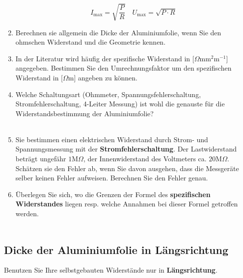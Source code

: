 \begin{enumerate}[$a)$]
{{\begin{center}
\end{center}}}
\begin{equation}
\boxed{I_{\text{max}}=\sqrt{\dfrac{P}{R}}}\quad \boxed{U_{\text{max}}=\sqrt{P\cdot R}}
\end{equation}
\item Berechnen sie allgemein die Dicke der Aluminiumfolie, wenn Sie den ohmschen Widerstand und die Geometrie kennen.
{}
\item In der Literatur wird häufig der spezifische Widerstand in [$\Omega\text{mm}^2\text{m}^{-1}$] angegeben. Bestimmen Sie den Umrechnungsfaktor um den spezifischen Widerstand in [$\Omega\text{m}$] angeben zu können.
{}
\item Welche Schaltungsart (Ohmmeter, Spannungsfehlerschaltung, Stromfehlerschaltung, 4-Leiter Messung) ist wohl die genauste für die Widerstandsbestimmung der Aluminiumfolie?
\\\\
{\color{red}{$\Rightarrow$ Die 4-Leiter-Messung.}}
\item Sie bestimmen einen elektrischen Widerstand durch Strom- und Spannungsmessung mit der \textbf{Stromfehlerschaltung}. Der Lastwiderstand beträgt ungefähr $1\text{M}\Omega$, der Innenwiderstand des Voltmeters ca. $20\text{M}\Omega$. Schätzen sie den Fehler ab, wenn Sie davon ausgehen, dass die Messgeräte selber keinen Fehler aufweisen. Berechnen Sie den Fehler genau.
{}
\item Überlegen Sie sich, wo die Grenzen der Formel des \textbf{spezifischen Widerstandes} liegen resp. welche Annahmen bei dieser Formel getroffen werden.
\\\\
{\color{red}{$\Rightarrow$ Materialtoleranzen.}}
\end{enumerate}
\subsection{Dicke der Aluminiumfolie in Längsrichtung}
Benutzen Sie Ihre selbstgebauten Widerstände nur in \textbf{Längsrichtung}.
